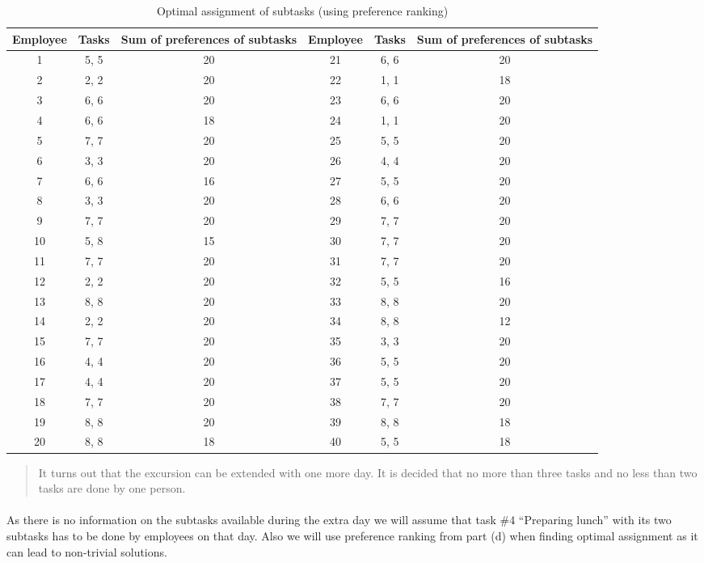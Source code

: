 \begin{enumerate}[(a)]
\begin{table}[H]
	\centering
	\caption{Optimal assignment of subtasks (using preference ranking)}
	\begin{tabular}{ccc||ccc}\hline
Employee & Tasks & Sum of preferences of subtasks & Employee & Tasks & Sum of preferences of subtasks \\ \hline
1 & 5, 5 & 20 & 21 & 6, 6 & 20 \\
2 & 2, 2 & 20 & 22 & 1, 1 & 18 \\
3 & 6, 6 & 20 & 23 & 6, 6 & 20 \\
4 & 6, 6 & 18 & 24 & 1, 1 & 20 \\
5 & 7, 7 & 20 & 25 & 5, 5 & 20 \\
6 & 3, 3 & 20 & 26 & 4, 4 & 20 \\
7 & 6, 6 & 16 & 27 & 5, 5 & 20 \\
8 & 3, 3 & 20 & 28 & 6, 6 & 20 \\
9 & 7, 7 & 20 & 29 & 7, 7 & 20 \\
10 & 5, 8 & 15 & 30 & 7, 7 & 20 \\
11 & 7, 7 & 20 & 31 & 7, 7 & 20 \\
12 & 2, 2 & 20 & 32 & 5, 5 & 16 \\
13 & 8, 8 & 20 & 33 & 8, 8 & 20 \\
14 & 2, 2 & 20 & 34 & 8, 8 & 12 \\
15 & 7, 7 & 20 & 35 & 3, 3 & 20 \\
16 & 4, 4 & 20 & 36 & 5, 5 & 20 \\
17 & 4, 4 & 20 & 37 & 5, 5 & 20 \\
18 & 7, 7 & 20 & 38 & 7, 7 & 20 \\
19 & 8, 8 & 20 & 39 & 8, 8 & 18 \\
20 & 8, 8 & 18 & 40 & 5, 5 & 18 \\
\hline
	\end{tabular}
	\label{hungarian-3-d}
\end{table}

\begin{quote}It turns out that the excursion can be extended with one more day. It is decided that
no more than three tasks and no less than two tasks are done by one person.\end{quote}

	\paragraph{}
	As there is no information on the subtasks available during the extra day we will assume that task \#4 ``Preparing lunch'' with its two subtasks has to be done by employees on that day. Also we will use preference ranking from part (d) when finding optimal assignment as it can lead to non-trivial solutions.


\end{enumerate}
